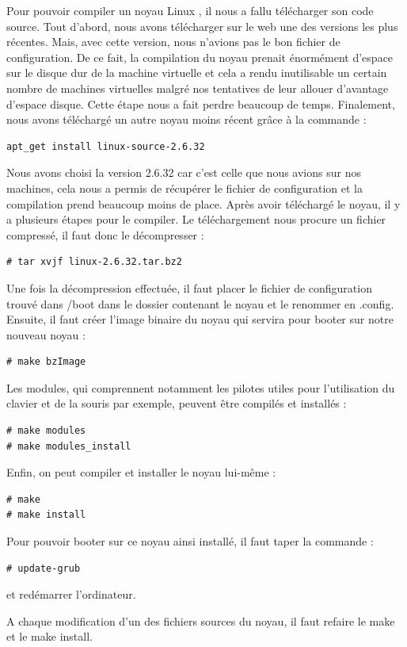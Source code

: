 \documentclass[a4paper]{article}
\begin{document}
Pour pouvoir compiler un noyau Linux \cite{compil}, il nous a fallu télécharger son code source. 
Tout d'abord, nous avons télécharger sur le web une des versions les plus récentes. 
Mais, avec cette version, nous n'avions pas le bon fichier de configuration. De ce fait, 
la compilation du noyau prenait énormément d'espace sur le disque dur de la machine virtuelle 
et cela a rendu inutilisable un certain nombre de machines virtuelles malgré nos tentatives 
de leur allouer d'avantage d'espace disque. Cette étape nous a fait perdre beaucoup de temps.
Finalement, nous avons téléchargé un autre noyau moins récent grâce à la commande :
\begin{verbatim}
apt_get install linux-source-2.6.32
\end{verbatim}
Nous avons choisi la version 2.6.32 car c'est celle que nous avions sur nos machines, 
cela nous a permis de récupérer le fichier de configuration et la compilation prend beaucoup moins de place.
Après avoir téléchargé le noyau, il y a plusieurs étapes pour le compiler. 
Le téléchargement nous procure un fichier compressé, il faut donc le décompresser :
\begin{verbatim}
# tar xvjf linux-2.6.32.tar.bz2
\end{verbatim}
Une fois la décompression effectuée, il faut placer le fichier de configuration trouvé dans /boot dans le dossier contenant le noyau et le renommer en .config.
Ensuite, il faut créer l'image binaire du noyau qui servira pour booter sur notre nouveau noyau :
\begin{verbatim}
# make bzImage
\end{verbatim}
Les modules, qui comprennent notamment les pilotes utiles pour l'utilisation du clavier et de la souris par exemple, peuvent être compilés et installés :
\begin{verbatim}
# make modules
# make modules_install
\end{verbatim}
Enfin, on peut compiler et installer le noyau lui-même :
\begin{verbatim}
# make
# make install
\end{verbatim}
Pour pouvoir booter sur ce noyau ainsi installé, il faut taper la commande :
\begin{verbatim}
# update-grub
\end{verbatim}
et redémarrer l'ordinateur.

A chaque modification d'un des fichiers sources du noyau, il faut refaire le make et le make install.
\end{document}

